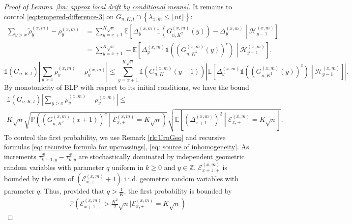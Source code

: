 \documentclass[EJP]{ejpecp} %
\begin{document}
\begin{proof}[Proof of Lemma~\ref{lm: approx local drift by conditional means}]
	It remains to control  \eqref{eq:tempered-difference-3} on $G_{n, K, t} \cap \left\{\lambda_{x,m} \leq\lfloor nt \rfloor \right\}$:
	\begin{align*}
		\sum_{y > x} \tilde\rho_y^{(x,m)} - \rho_y^{(x,m)}
		&= \sum_{y = x + 1}^{K \sqrt{n} } \mathbb{E}\left[ \Delta_y^{(x,m)}\mathbb{1}\left( G_{n, K^2}^{(x,m)}(y) \right) - \Delta_{y}^{(x,m)} \middle| \mathcal{H}_{y-1}^{(x,m)}  \right]  \\
		&= \sum_{y = x + 1}^{K \sqrt{n} } -\mathbb{E}\left[ \Delta_y^{(x,m)}\mathbb{1}\left( \left( G_{n, K^2}^{(x,m)}(y) \right) ^c \right) \middle| \mathcal{H}_{y-1}^{(x,m)}  \right]
		.\end{align*}
	\[
	\mathbb{1}(G_{n, K, t}) \left| 
	\sum_{y > x} \tilde\rho_y^{(x,m)} - \rho_y^{(x,m)}
	\right| 
	\le  \sum_{y = x + 1}^{K \sqrt{n} } \mathbb{1}\left(G_{n, K}^{(x,m)}(y-1)\right) 
	\left|  \mathbb{E}\left[ \Delta_y^{(x,m)}\mathbb{1}\left( \left( G_{n, K^2}^{(x,m)}(y) \right) ^c \right) \middle| \mathcal{H}_{y-1}^{(x,m)}  \right] \right| 
	.\] 
	By monotonicity of BLP with respect to its initial conditions, we have the bound
	\begin{multline*}
		\mathbb{1}(G_{n, K, t})
		\left| \sum_{y > x} \tilde\rho_y^{(x,m)} - \rho_y^{(x,m)} \right| \le \\
		K \sqrt{n} 
		\sqrt{ \mathbb{P}\left( \left( G^{(x,m)}_{n, K^2}(x+1) \right) ^{c} \middle| \mathcal{E}_{x,+}^{(x,m)} = K \sqrt{n}  \right) }
		\sqrt{ \mathbb{E}\left[ \left(\Delta_{x+1}^{(x,m)}\right)^2 \middle| \mathcal{E}_{x,+}^{(x,m)} = K \sqrt{n}  \right]}
		.\end{multline*}
	To control the first probability, we use Remark \ref{rk:UrnGeo} and recursive formulas \eqref{eq: recursive formula for upcrossings}, \eqref{eq: source of inhomogeneity}. As increments $\tau^{\mathscr{B}}_{k+1,y} -\tau^{\mathscr{B}}_{k,y}$ are stochastically dominated by independent geometric random variables with parameter $q$ uniform in $ k \geq 0$ and $y \in \mathbb{Z}$, $\mathcal{E}_{x+1,+}^{(x,m)}$ is bounded by the sum of $ (\mathcal{E}_{x,+}^{(x,m)} +1) $ i.i.d. geometric random variables with parameter $q$. 
	Thus, provided that $q> \frac{1}{K}$, the first probability is bounded by
	\begin{align*}
		\mathbb{P}\left(\mathcal{E}_{x+1,+}^{(x,m)} > \frac{K^2}{2} \sqrt{n} | \mathcal{E}_{x,+}^{(x, m)} = K \sqrt{n}\right)

\end{align*}
\end{proof}
\end{document}
